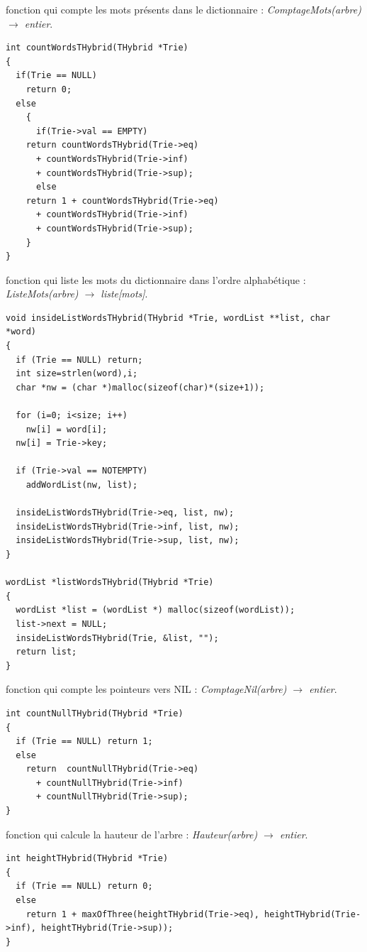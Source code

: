 \documentclass[a4paper,8pt]{report}
\begin{document}
fonction qui compte les mots pr\'esents dans le dictionnaire : \textit{ComptageMots(arbre) $\rightarrow$ entier}.
\begin{verbatim}
int countWordsTHybrid(THybrid *Trie)
{
  if(Trie == NULL)
    return 0;
  else 
    {
      if(Trie->val == EMPTY)
	return countWordsTHybrid(Trie->eq) 
	  + countWordsTHybrid(Trie->inf) 
	  + countWordsTHybrid(Trie->sup);
      else
	return 1 + countWordsTHybrid(Trie->eq) 
	  + countWordsTHybrid(Trie->inf) 
	  + countWordsTHybrid(Trie->sup);
    }
}
\end{verbatim}

fonction qui liste les mots du dictionnaire dans l'ordre alphab\'etique : \textit{ListeMots(arbre) $\rightarrow$ liste[mots]}.
\begin{verbatim}
void insideListWordsTHybrid(THybrid *Trie, wordList **list, char *word)
{
  if (Trie == NULL) return;
  int size=strlen(word),i;
  char *nw = (char *)malloc(sizeof(char)*(size+1));

  for (i=0; i<size; i++)
    nw[i] = word[i];
  nw[i] = Trie->key;

  if (Trie->val == NOTEMPTY)
    addWordList(nw, list);

  insideListWordsTHybrid(Trie->eq, list, nw);
  insideListWordsTHybrid(Trie->inf, list, nw);
  insideListWordsTHybrid(Trie->sup, list, nw);
}

wordList *listWordsTHybrid(THybrid *Trie)
{
  wordList *list = (wordList *) malloc(sizeof(wordList));
  list->next = NULL;
  insideListWordsTHybrid(Trie, &list, "");
  return list;
}
\end{verbatim}

fonction qui compte les pointeurs vers NIL : \textit{ComptageNil(arbre) $\rightarrow$ entier}.
\begin{verbatim}
int countNullTHybrid(THybrid *Trie)
{
  if (Trie == NULL) return 1;
  else
    return  countNullTHybrid(Trie->eq)
      + countNullTHybrid(Trie->inf)
      + countNullTHybrid(Trie->sup);
}
\end{verbatim}

fonction qui calcule la hauteur de l'arbre : \textit{Hauteur(arbre) $\rightarrow$ entier}.
\begin{verbatim}
int heightTHybrid(THybrid *Trie)
{
  if (Trie == NULL) return 0;
  else
    return 1 + maxOfThree(heightTHybrid(Trie->eq), heightTHybrid(Trie->inf), heightTHybrid(Trie->sup));
}
\end{verbatim}
\end{document}
